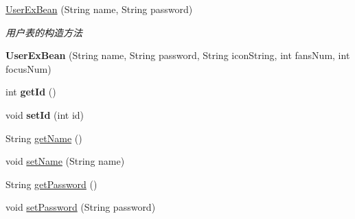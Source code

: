 \begin{DoxyCompactItemize}
\item 
\mbox{\hyperlink{classcom_1_1android_1_1keche_1_1baidutiebar_1_1server_1_1bean_1_1_user_ex_bean_ac2fc10920dc549e182bc8e8a869f4b3b}{User\+Ex\+Bean}} (String name, String password)
\begin{DoxyCompactList}\small\item\em 用户表的构造方法 \end{DoxyCompactList}\item 
\mbox{\label{classcom_1_1android_1_1keche_1_1baidutiebar_1_1server_1_1bean_1_1_user_ex_bean_a38594a57228bc114af5465764b915bc0}} 
{\bfseries User\+Ex\+Bean} (String name, String password, String icon\+String, int fans\+Num, int focus\+Num)
\item 
\mbox{\label{classcom_1_1android_1_1keche_1_1baidutiebar_1_1server_1_1bean_1_1_user_ex_bean_a02851cd0139adc51845db349ac40490e}} 
int {\bfseries get\+Id} ()
\item 
\mbox{\label{classcom_1_1android_1_1keche_1_1baidutiebar_1_1server_1_1bean_1_1_user_ex_bean_a982cefa310d5429c44029dbcb8560acc}} 
void {\bfseries set\+Id} (int id)
\item 
String \mbox{\hyperlink{classcom_1_1android_1_1keche_1_1baidutiebar_1_1server_1_1bean_1_1_user_ex_bean_ac1bf507f7cc774d41c89d117f23176c5}{get\+Name}} ()
\item 
void \mbox{\hyperlink{classcom_1_1android_1_1keche_1_1baidutiebar_1_1server_1_1bean_1_1_user_ex_bean_a9253999f7ad946c03a3a7e1fd88fdfdd}{set\+Name}} (String name)
\item 
String \mbox{\hyperlink{classcom_1_1android_1_1keche_1_1baidutiebar_1_1server_1_1bean_1_1_user_ex_bean_acc2bcd547a37930973ecf55395970b46}{get\+Password}} ()
\item 
void \mbox{\hyperlink{classcom_1_1android_1_1keche_1_1baidutiebar_1_1server_1_1bean_1_1_user_ex_bean_a1322157e2aa219a479385d48ae594e15}{set\+Password}} (String password)
\item 
\mbox{\label{classcom_1_1android_1_1keche_1_1baidutiebar_1_1server_1_1bean_1_1_user_ex_bean_ae19916e627a1577391b4a246124bb827}} 

\end{DoxyCompactItemize}
